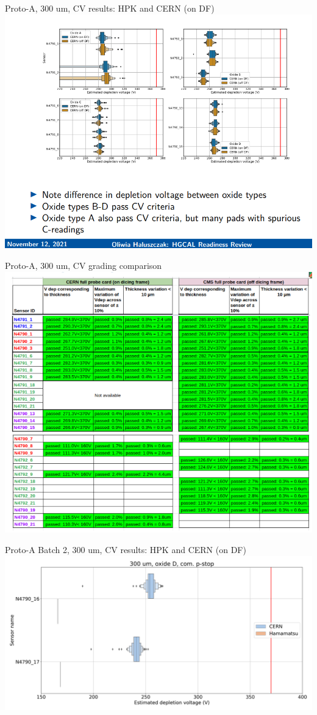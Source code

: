 \documentclass{beamer}
\begin{document}
\begin{frame}{Proto-A, 300 um, CV results: HPK and CERN (on DF)}
  \includegraphics[width=.8\textwidth]{plots/CV_CERN_HPK_300um.png}
\end{frame}

\begin{frame}{Proto-A, 300 um, CV grading comparison}
  \includegraphics[width=.7\textwidth]{plots/CV_grading_300um.png}
\end{frame}

\begin{frame}{Proto-A Batch 2, 300 um, CV results: HPK and CERN (on DF)}
  \includegraphics[width=.8\textwidth]{plots/CV_ComparisonHPK_300um.png}
\end{frame}
\end{document}

